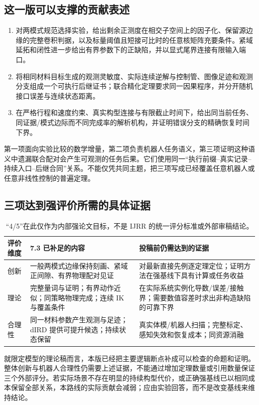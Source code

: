 \documentclass[UTF8,fontset=fandol,zihao=5,a4paper]{ctexart}
\theoremstyle{definition}
\theoremstyle{remark}\newtheorem{remark}[theorem]{说明}
\numberwithin{equation}{section}
\begin{document}
\subsection{这一版可以支撑的贡献表述}
\begin{enumerate}
\item 对两模式规范选择实验，给出剩余正测度在相交子空间上的因子化、保留源边缘的完整卷积判据，以及标量阈值且短接可比时的任意核矩阵充要条件。紧域延拓和闭性进一步给出有界参数下的正缺陷，并以显式尾界连接有限输入端口。
\item 将相同材料目标生成的观测灵敏度、实际连续逆解与控制管、图像足迹和观测分支组成一个可执行后继证书；联合精化定理要求同一因果程序，并分开随机接口误差与连续状态距离。
\item 在严格行程和速度约束、真实构型连接与有限截止时间下，给出同当前任务、同证据/模式边际而不同完成率的解析机构，并证明错误分支的精确恢复时间下界。
\end{enumerate}
第一项面向实验比较的数学增量，第二项负责机器人任务语义，第三项证明这种语义中遗漏联合配对会产生可观测的任务后果。它们使用同一“执行前缀--真实记录--持续入口--后继合同”关系。不能仅凭共同主题，把三项写成已经覆盖任意机器人或任意非线性控制的普遍定理。

\subsection{三项达到强评价所需的具体证据}
\begin{table}[htbp]\centering\small
\begin{tabularx}{\linewidth}{p{.15\linewidth}YY}
\toprule 评价维度 & 7.3 已补足的内容 & 投稿前仍需达到的证据\\\midrule
创新 & 一般两模式边缘保持刻画、紧域正间隙、有界物理配对见证 & 对最新直接先例逐定理定位；证明方法在强基线下具有计算或任务收益\\
理论 & 完整量词与证明；有界动作近似；同策略物理完成；连续 IK 与覆盖条件 & 在实际系统实例化导数/误差/接触界；需要数值容差时求出非构造缺陷的可靠下界\\
合理性 & 同一材料参数产生观测与足迹；dIRD 提供可提升候选；持续状态保留 & 真实体模/机器人扫描；完整标定、感知失效和恢复成本；同资源消融\\
\bottomrule
\end{tabularx}
\caption{“4/5”在此仅作为内部强论文目标，不是 IJRR 的统一评分标准或外部审稿结论。}
\end{table}

就限定模型的理论稿而言，本版已经把主要逻辑断点补成可以检查的命题和证明。整体创新与机器人合理性仍需要上述证据，不能通过增加定理数量或引用数量保证三个外部评分。若实际场景不存在明显的持续构型代价，或正确强基线已以相同成本保留全部关系，本路线的实际贡献会减弱；应由实验回答，而不是改变基线来维持结论。
\end{document}
